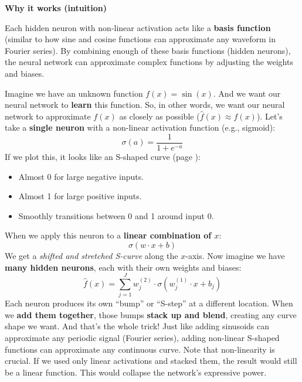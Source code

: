 \highspace
\begin{flushleft}
    \textcolor{Green3}{ \textbf{Why it works (intuition)}}
\end{flushleft}
Each hidden neuron with non-linear activation acts like a \textbf{basis function} (similar to how sine and cosine functions can approximate any waveform in Fourier series). By combining enough of these basis functions (hidden neurons), the neural network can approximate complex functions by adjusting the weights and biases.

\highspace
Imagine we have an unknown function $f(x) = \sin(x)$. And we want our neural network to \textbf{learn} this function. So, in other words, we want our neural network to approximate $f(x)$ as closely as possible ($\hat{f}(x) \approx f(x)$). Let's take a \textbf{single neuron} with a non-linear activation function (e.g., sigmoid):
\begin{equation*}
    \sigma(a) = \dfrac{1}{1 + e^{-a}}
\end{equation*}
If we plot this, it looks like an S-shaped curve (page \pageref{fig:sigmoid-activation-function}):
\begin{itemize}
    \item Almost 0 for large negative inputs.
    \item Almost 1 for large positive inputs.
    \item Smoothly transitions between 0 and 1 around input 0.
\end{itemize}
When we apply this neuron to a \textbf{linear combination of $x$}:
\begin{equation*}
    \sigma(w \cdot x + b)
\end{equation*}
We get a \emph{shifted and stretched S-curve} along the $x$-axis. Now imagine we have \textbf{many hidden neurons}, each with their own weights and biases:
\begin{equation*}
    \hat{f}(x) = \displaystyle\sum_{j=1}^{J} w_{j}^{(2)} \cdot \sigma(w_{j}^{(1)} \cdot x + b_{j})
\end{equation*}
Each neuron produces its own ``bump'' or ``S-step'' at a different location. When we \textbf{add them together}, those bumps \textbf{stack up and blend}, creating any curve shape we want. And that's the whole trick! Just like adding sinusoids can approximate any periodic signal (Fourier series), adding non-linear S-shaped functions can approximate any continuous curve. Note that non-linearity is crucial. If we used only linear activations and stacked them, the result would still be a linear function. This would collapse the network's expressive power.

